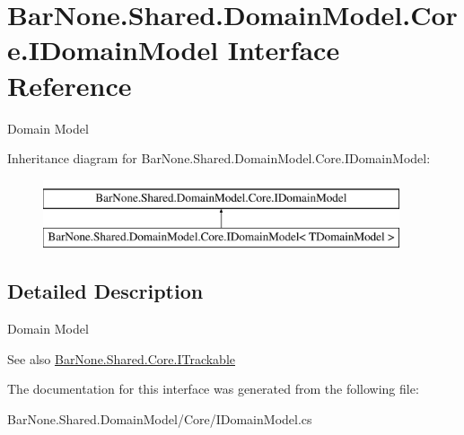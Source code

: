 \hypertarget{interface_bar_none_1_1_shared_1_1_domain_model_1_1_core_1_1_i_domain_model}{}\section{Bar\+None.\+Shared.\+Domain\+Model.\+Core.\+I\+Domain\+Model Interface Reference}
\label{interface_bar_none_1_1_shared_1_1_domain_model_1_1_core_1_1_i_domain_model}


Domain Model  


Inheritance diagram for Bar\+None.\+Shared.\+Domain\+Model.\+Core.\+I\+Domain\+Model\+:\begin{figure}[H]
\begin{center}
\leavevmode
\includegraphics[height=2.000000cm]{interface_bar_none_1_1_shared_1_1_domain_model_1_1_core_1_1_i_domain_model}
\end{center}
\end{figure}


\subsection{Detailed Description}
Domain Model 

\begin{DoxySeeAlso}{See also}
\mbox{\hyperlink{interface_bar_none_1_1_shared_1_1_core_1_1_i_trackable}{Bar\+None.\+Shared.\+Core.\+I\+Trackable}}


\end{DoxySeeAlso}


The documentation for this interface was generated from the following file\+:\begin{DoxyCompactItemize}
\item 
Bar\+None.\+Shared.\+Domain\+Model/\+Core/I\+Domain\+Model.\+cs\end{DoxyCompactItemize}
